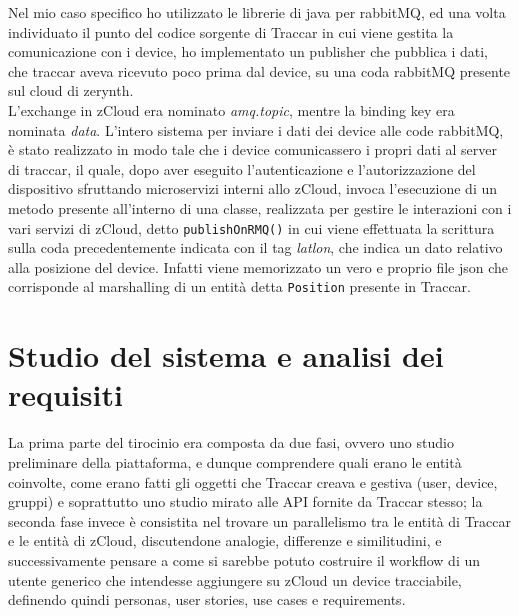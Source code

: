 \documentclass[a4paper,titlepage,12pt]{book}
\begin{document}
{Nel mio caso specifico ho utilizzato le librerie di java per rabbitMQ, ed una volta individuato il punto del codice sorgente di Traccar in cui viene gestita la comunicazione con i device, ho implementato un publisher che pubblica i dati, che traccar aveva ricevuto poco prima dal device, su una coda rabbitMQ presente sul cloud di zerynth.\\
L'exchange in zCloud era nominato \textit{amq.topic}, mentre la binding key era nominata \textit{data}. L'intero sistema per inviare i dati dei device alle code rabbitMQ, è stato realizzato in modo tale che i device comunicassero i propri dati al server di traccar, il quale, dopo aver eseguito l'autenticazione e l'autorizzazione del dispositivo sfruttando microservizi interni allo zCloud, invoca l'esecuzione di un metodo presente all'interno di una classe, realizzata per gestire le interazioni con i vari servizi di zCloud, detto \texttt{publishOnRMQ()} in cui viene effettuata la scrittura sulla coda precedentemente indicata con il tag \textit{latlon}, che indica un dato relativo alla posizione del device. Infatti viene memorizzato un vero e proprio file json che corrisponde al marshalling di un entità detta \texttt{Position} presente in Traccar.
\chapter{
Studio del sistema e analisi dei requisiti}
La prima parte del tirocinio era composta da due fasi, ovvero uno studio preliminare della piattaforma, e dunque comprendere quali erano le entità coinvolte, come erano fatti gli oggetti che Traccar creava e gestiva (user, device, gruppi) e soprattutto uno studio mirato alle API fornite da Traccar stesso; la seconda fase invece è consistita nel trovare un parallelismo tra le entità di Traccar e le entità di zCloud, discutendone analogie, differenze e similitudini, e successivamente pensare a come si sarebbe potuto costruire il workflow di un utente generico che intendesse aggiungere su zCloud un device tracciabile, definendo quindi personas, user stories, use cases e requirements.\\

}
\end{document}

